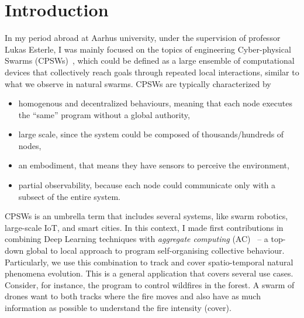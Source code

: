 \documentclass{article}
\begin{document}
\section{Introduction}
In my period abroad at Aarhus university, under the supervision of professor Lukas Esterle, 
 I was mainly focused on the topics of engineering Cyber-physical Swarms (CPSWs)~\cite{aguzzi2021research}, which could be defined as a
 large ensemble of computational devices that collectively reach goals through repeated local interactions, similar to what we observe in natural swarms. 
CPSWs are typically characterized by 
\begin{itemize}
\item homogenous and decentralized behaviours, meaning that each node executes the ``same'' program without a global authority,
\item large scale, since the system could be composed of thousands/hundreds of nodes, 
\item an embodiment, that means they have sensors to perceive the environment,
\item partial observability, because each node could communicate only with a subsect of the entire system.
\end{itemize}
CPSWs is an umbrella term that includes several systems, 
like swarm robotics, large-scale IoT, and smart cities.
%
In this context, I made first contributions in combining Deep Learning techniques with \textit{aggregate computing} (AC)~\cite{beal2015aggregate}
 -- a top-down global to local approach to program self-organising collective behaviour.
Particularly, we use this combination to track and cover spatio-temporal natural phenomena evolution. 
%
This is a general application that covers several use cases. 
 Consider, for instance, the program to control wildfires in the forest. 
 A swarm of drones want to both tracks where the fire moves and also have as much information as possible to understand the fire intensity (cover).
%
 
\end{document}
